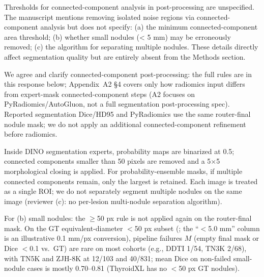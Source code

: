 \label{rev:R2.20}
\begin{reviewercomment}
Thresholds for connected-component analysis in post-processing are unspecified. The manuscript mentions removing isolated noise regions via connected-component analysis but does not specify: (a) the minimum connected-component area threshold; (b) whether small nodules (< 5 mm) may be erroneously removed; (c) the algorithm for separating multiple nodules. These details directly affect segmentation quality but are entirely absent from the Methods section.
\end{reviewercomment}
\begin{authorresponse}
We agree and clarify connected-component post-processing: the full rules are in this response below; Appendix~A2 §4 covers only how radiomics input differs from expert-mask connected-component steps (A2 focuses on PyRadiomics/AutoGluon, not a full segmentation post-processing spec). Reported segmentation Dice/HD95 and PyRadiomics use the same router-final nodule mask; we do not apply an additional connected-component refinement before radiomics.\par
Inside DINO segmentation experts, probability maps are binarized at 0.5; connected components smaller than 50 pixels are removed and a 5$\times$5 morphological closing is applied. For probability-ensemble masks, if multiple connected components remain, only the largest is retained. Each image is treated as a single ROI; we do not separately segment multiple nodules on the same image (reviewer (c): no per-lesion multi-nodule separation algorithm).\par
For (b) small nodules: the $\geq$50 px rule is not applied again on the router-final mask. On the GT equivalent-diameter $<$50 px subset (; the ``$<$5.0 mm'' column is an illustrative 0.1 mm/px conversion), pipeline failures $M$ (empty final mask or Dice $<$0.1 vs.\ GT) are rare on most cohorts (e.g., DDTI 1/54, TN3K 2/68), with TN5K and ZJH-8K at 12/103 and 40/831; mean Dice on non-failed small-nodule cases is mostly 0.70--0.81 (ThyroidXL has no $<$50 px GT nodules).\par
\par
\end{authorresponse}



